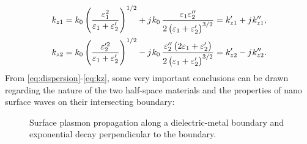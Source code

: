 \begin{subequations}
  \begin{align}
    k_{z1} = k_0 \left( \frac{\varepsilon_1^2}{\varepsilon_1 + \varepsilon_2'} \right)^{1/2} + j\mkern1mu k_0 \,  \frac{ \varepsilon_1 \varepsilon_2''}{2 \left( \varepsilon_1 + \varepsilon_2' \right)^{3/2}} = k_{z1}' + j\mkern1mu k_{z1}'',
    \label{eq:kz1} \\
    k_{z2} = k_0 \left( \frac{\varepsilon_2'^2}{\varepsilon_1 + \varepsilon_2'} \right)^{1/2} - j\mkern1mu k_0 \, \frac{\varepsilon_2''\left( 2\varepsilon_1 + \varepsilon_2' \right) }{2 \left( \varepsilon_1 + \varepsilon_2' \right)^{3/2}} = k_{z2}' - j\mkern1mu k_{z2}''.
    \label{eq:kz2}
  \end{align}
  \label{eq:kz}%
\end{subequations}
%
From \eqref{eq:dispersion}-\eqref{eq:kz}, some very important conclusions can be drawn regarding the nature of the two half-space materials and the properties of nano surface waves on their intersecting boundary:
%
\begin{figure}[b!]
  \centering
  \def\svgwidth{.75\linewidth}
  
  \caption{Surface plasmon propagation along a dielectric-metal boundary and exponential decay perpendicular to the boundary.}
  \label{fig:spp}
\end{figure}
%
